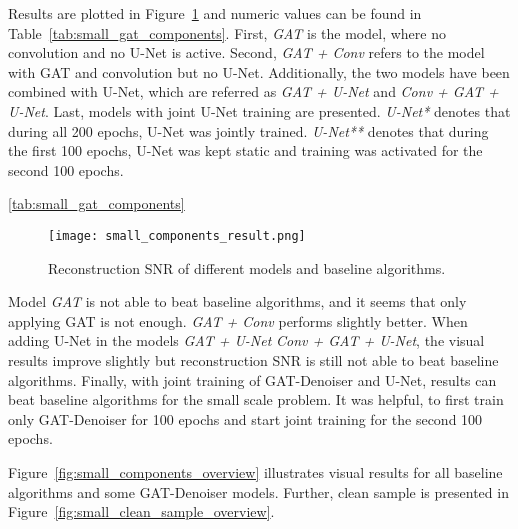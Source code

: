 Results are plotted in Figure~\ref{fig:small_components} and numeric values can be found in Table~\ref{tab:small_gat_components}.
First, \textit{GAT} is the model, where no convolution and no U-Net is active. 
Second, \textit{GAT + Conv} refers to the model with GAT and convolution but no U-Net.
Additionally, the two models have been combined with U-Net, which are referred as 
\textit{GAT + U-Net} and \textit{Conv + GAT + U-Net}.
Last, models with joint U-Net training are presented.
\textit{U-Net*} denotes that during all 200 epochs, U-Net was jointly trained.
\textit{U-Net**} denotes that during the first 100 epochs, U-Net was kept static 
and training was activated for the second 100 epochs.

\ref{tab:small_gat_components}

\begin{figure}[H]
  \centering
  \label{fig:small_components}
  \texttt{[image: small\_components\_result.png]}
  \caption{
    Reconstruction SNR of different models and baseline algorithms.
    }
\end{figure}

Model \textit{GAT} is not able to beat baseline algorithms, and it seems that only applying GAT is not enough.
\textit{GAT + Conv} performs slightly better. When adding U-Net in the models \textit{GAT + U-Net} \textit{Conv + GAT + U-Net},
the visual results improve slightly but reconstruction SNR is still not able to beat baseline algorithms.
Finally, with joint training of GAT-Denoiser and U-Net, 
results can beat baseline algorithms for the small scale problem. It was helpful, to first train only GAT-Denoiser for 100 epochs 
and start joint training for the second 100 epochs.

Figure~\ref{fig:small_components_overview} illustrates visual results for all baseline algorithms and some GAT-Denoiser models.
Further, clean sample is presented in Figure~\ref{fig:small_clean_sample_overview}.

